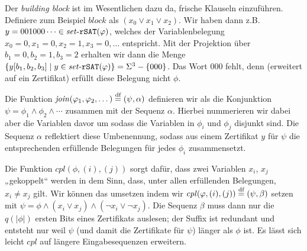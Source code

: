 Der \emph{building block} ist im Wesentlichen dazu da, frische Klauseln einzuführen. Definiere zum Beispiel $\mathit{block}$ als $(x_0\lor x_1\lor x_2)$. Wir haben dann z.B. $y=001000\cdots\in\mathit{set}\text{-}{}\mathtt{rSAT}(\varphi)$, welches der Variablenbelegung $x_0=0,x_1=0,x_2=1,x_3=0,\ldots$ entspricht. Mit der Projektion über $b_1=0,b_2=1,b_3=2$ erhalten wir dann die Menge $\{ y[b_1,b_2,b_3] \mid y\in\mathit{set}\text{-}\mathtt{rSAT}(\varphi)\} = \Sigma^3-\{000\}$. Das Wort $000$ fehlt, denn (erweitert auf ein Zertifikat) erfüllt diese Belegung nicht $\phi$.

Die Funktion $\mathit{join}(\varphi_1, \varphi_2, \dots)\stackrel{\text{df}}{=}(\psi,\alpha)$ definieren wir als die Konjunktion $\psi=\phi_1\land\phi_2\land\cdots$ zusammen mit der Sequenz $\alpha$. Hierbei nummerieren wir dabei aber die Variablen davor um sodass die Variablen in $\phi_i$ und $\phi_j$ disjunkt sind. Die Sequenz $\alpha$ reflektiert diese Umbenennung, sodass aus einem Zertifikat $y$ für $\psi$ die entsprechenden erfüllende Belegungen für jedes $\phi_i$ zusammensetzt.

Die Funktion $\mathit{cpl}(\phi, (i), (j))$ sorgt dafür, dass zwei Variablen $x_i$, $x_j$ „gekoppelt“ werden in dem Sinn, dass, unter allen erfüllenden Belegungen, $x_i\neq x_j$ gilt. Wir können das umsetzen indem wir $\mathit{cpl}(\varphi, (i), (j))\stackrel{\text{df}}{=}(\psi, \beta)$ setzen mit $\psi=\phi\land (x_i\lor x_j) \land (\neg x_i\lor \neg x_j)$. Die Sequenz $\beta$ muss dann nur die $q(|\phi|)$ ersten Bits eines Zertifikats auslesen; der Suffix ist redundant und entsteht nur weil $\psi$ (und damit die Zertifikate für $\psi$) länger als $\phi$ ist. Es lässt sich leicht $\mathit{cpl}$ auf längere Eingabesequenzen erweitern.

